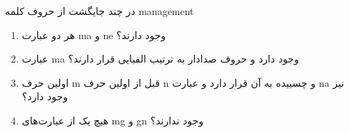   در چند جایگشت از حروف کلمه management
  \begin{enumerate}
    \item
    هر دو عبارت ma و ne وجود دارند؟
    \item
    عبارت ma وجود دارد و حروف صدادار به ترتیب الفبایی قرار دارند؟
    \item
    اولین حرف m قبل از اولین حرف n و چسبیده به آن قرار دارد و عبارت na نیز وجود دارد؟
    \item
    هیچ یک از عبارت‌های mg و gn وجود ندارند؟
  \end{enumerate}